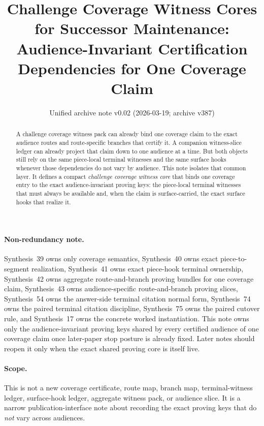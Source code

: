 \documentclass[11pt]{article}
\title{Challenge Coverage Witness Cores for Successor Maintenance:\\[0.5ex]
\large Audience-Invariant Certification Dependencies for One Coverage Claim}
\author{}
\date{Unified archive note v0.02 (2026-03-19; archive v387)}
\begin{document}
\maketitle

\begin{abstract}
A challenge coverage witness pack can already bind one coverage claim to the exact audience routes and route-specific branches that certify it.
A companion witness-slice ledger can already project that claim down to one audience at a time.
But both objects still rely on the same piece-local terminal witnesses and the same surface hooks whenever those dependencies do not vary by audience.
This note isolates that common layer.
It defines a compact \emph{challenge coverage witness core} that binds one coverage entry to the exact audience-invariant proving keys: the piece-local terminal witnesses that must always be available and, when the claim is surface-carried, the exact surface hooks that realize it.
\end{abstract}

\paragraph{Non-redundancy note.}
Synthesis~39 owns only coverage semantics, Synthesis~40 owns exact piece-to-segment realization, Synthesis~41 owns exact piece-hook terminal ownership, Synthesis~42 owns aggregate route-and-branch proving bundles for one coverage claim, Synthesis~43 owns audience-specific route-and-branch proving slices, Synthesis~54 owns the answer-side terminal citation normal form, Synthesis~74 owns the paired terminal citation discipline, Synthesis~75 owns the paired cutover rule, and Synthesis~17 owns the concrete worked instantiation.
This note owns only the audience-invariant proving keys shared by every certified audience of one coverage claim once later-paper stop posture is already fixed. Later notes should reopen it only when the exact shared proving core is itself live.
\paragraph{Scope.}
This is not a new coverage certificate, route map, branch map, terminal-witness ledger, surface-hook ledger, aggregate witness pack, or audience slice.
It is a narrow publication-interface note about recording the exact proving keys that do \emph{not} vary across audiences.
\end{document}
